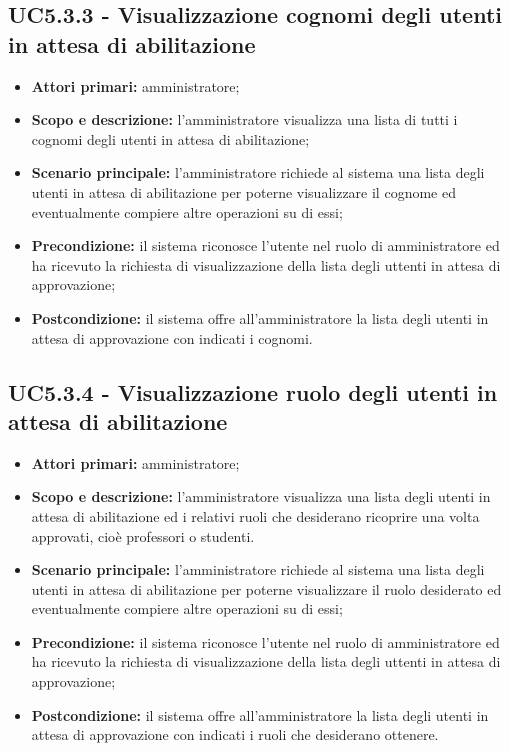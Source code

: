 \documentclass[AnalisiDeiRequisiti.tex]{subfiles}
\begin{document}
\subsection{UC5.3.3 - Visualizzazione cognomi degli utenti in attesa di abilitazione}
\begin{itemize}
	\item \textbf{Attori primari:} amministratore;
	\item \textbf{Scopo e descrizione:} l'amministratore visualizza una lista di tutti i cognomi degli utenti in attesa di abilitazione;
	\item \textbf{Scenario principale:} l'amministratore richiede al sistema una lista degli utenti in attesa di abilitazione per poterne visualizzare il cognome ed eventualmente compiere altre operazioni su di essi;
	\item \textbf{Precondizione:} il sistema riconosce l'utente nel ruolo di amministratore ed ha ricevuto la richiesta di visualizzazione della lista degli uttenti in attesa di approvazione;
	\item \textbf{Postcondizione:} il sistema offre all'amministratore la lista degli utenti in attesa di approvazione con indicati i cognomi.
\end{itemize}
\subsection{UC5.3.4 - Visualizzazione ruolo degli utenti in attesa di abilitazione}
\begin{itemize}
	\item \textbf{Attori primari:} amministratore;
	\item \textbf{Scopo e descrizione:} l'amministratore visualizza una lista degli utenti in attesa di abilitazione ed i relativi ruoli che desiderano ricoprire una volta approvati, cioè professori o studenti.
	\item \textbf{Scenario principale:} l'amministratore richiede al sistema una lista degli utenti in attesa di abilitazione per poterne visualizzare il ruolo desiderato ed eventualmente compiere altre operazioni su di essi;
	\item \textbf{Precondizione:} il sistema riconosce l'utente nel ruolo di amministratore ed ha ricevuto la richiesta di visualizzazione della lista degli uttenti in attesa di approvazione;
	\item \textbf{Postcondizione:} il sistema offre all'amministratore la lista degli utenti in attesa di approvazione con indicati i ruoli che desiderano ottenere.
\end{itemize}
\end{document}
